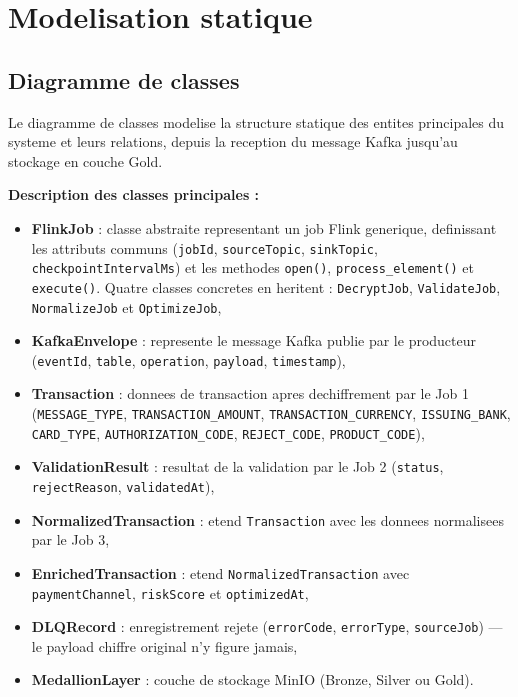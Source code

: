 \section{Modelisation statique}
\label{sec:statique}

\subsection{Diagramme de classes}

Le diagramme de classes modelise la structure statique des entites principales du
systeme et leurs relations, depuis la reception du message Kafka jusqu'au stockage en
couche Gold.

\textbf{Description des classes principales :}
\begin{itemize}
    \item \textbf{FlinkJob} : classe abstraite representant un job Flink generique,
    definissant les attributs communs (\texttt{jobId}, \texttt{sourceTopic},
    \texttt{sinkTopic}, \texttt{checkpointIntervalMs}) et les methodes
    \texttt{open()}, \texttt{process\_element()} et \texttt{execute()}. Quatre classes
    concretes en heritent : \texttt{DecryptJob}, \texttt{ValidateJob},
    \texttt{NormalizeJob} et \texttt{OptimizeJob},
    \item \textbf{KafkaEnvelope} : represente le message Kafka publie par le
    producteur (\texttt{eventId}, \texttt{table}, \texttt{operation},
    \texttt{payload}, \texttt{timestamp}),
    \item \textbf{Transaction} : donnees de transaction apres dechiffrement par le
    Job 1 (\texttt{MESSAGE\_TYPE}, \texttt{TRANSACTION\_AMOUNT},
    \texttt{TRANSACTION\_CURRENCY}, \texttt{ISSUING\_BANK}, \texttt{CARD\_TYPE},
    \texttt{AUTHORIZATION\_CODE}, \texttt{REJECT\_CODE}, \texttt{PRODUCT\_CODE}),
    \item \textbf{ValidationResult} : resultat de la validation par le Job 2
    (\texttt{status}, \texttt{rejectReason}, \texttt{validatedAt}),
    \item \textbf{NormalizedTransaction} : etend \texttt{Transaction} avec les
    donnees normalisees par le Job 3,
    \item \textbf{EnrichedTransaction} : etend \texttt{NormalizedTransaction} avec
    \texttt{paymentChannel}, \texttt{riskScore} et \texttt{optimizedAt},
    \item \textbf{DLQRecord} : enregistrement rejete (\texttt{errorCode},
    \texttt{errorType}, \texttt{sourceJob}) --- le payload chiffre original n'y figure
    jamais,
    \item \textbf{MedallionLayer} : couche de stockage MinIO (Bronze, Silver ou Gold).
\end{itemize}

